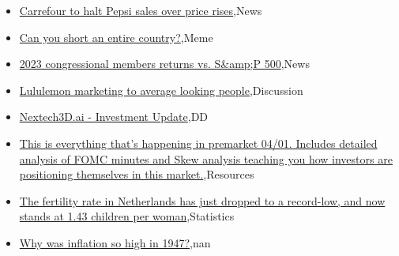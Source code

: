 \documentclass{article}%
\begin{document}
%
\begin{itemize}%
\item%
\href{https://reddit.com/r/wallstreetbets/comments/18yyps0/carrefour\_to\_halt\_pepsi\_sales\_over\_price\_rises/}{Carrefour to halt Pepsi sales over price rises},News%
\item%
\href{https://reddit.com/r/wallstreetbets/comments/18yygk1/can\_you\_short\_an\_entire\_country/}{Can you short an entire country?},Meme%
\item%
\href{https://reddit.com/r/wallstreetbets/comments/18yuuff/2023\_congressional\_members\_returns\_vs\_sp\_500/}{2023 congressional members returns vs. S\&amp;P 500},News%
\item%
\href{https://reddit.com/r/wallstreetbets/comments/18yul4v/lululemon\_marketing\_to\_average\_looking\_people/}{Lululemon marketing to average looking people},Discussion%
\item%
\href{https://reddit.com/r/Baystreetbets/comments/18yf9kw/nextech3dai\_investment\_update/}{Nextech3D.ai - Investment Update},DD%
\item%
\href{https://reddit.com/r/StockMarket/comments/18ybgum/this\_is\_everything\_thats\_happening\_in\_premarket/}{This is everything that's happening in premarket 04/01. Includes detailed analysis of FOMC minutes and Skew analysis teaching you how investors are positioning themselves in this market.},Resources%
\item%
\href{https://reddit.com/r/Economics/comments/18yszxb/the\_fertility\_rate\_in\_netherlands\_has\_just/}{The fertility rate in Netherlands has just dropped to a record-low, and now stands at 1.43 children per woman},Statistics%
\item%
\href{https://reddit.com/r/Economics/comments/18ynwe0/why\_was\_inflation\_so\_high\_in\_1947/}{Why was inflation so high in 1947?},nan%
\end{itemize}%
\end{document}
